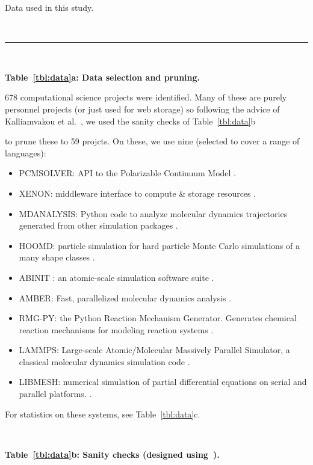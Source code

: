 \documentclass[10pt,conference]{IEEEtran}
\newcommand{\bi}{\begin{itemize}[leftmargin=0.4cm]}
\newcommand{\ei}{\end{itemize}}
\newcommand{\tbl}[1]{Table~\ref{tbl:#1}}
\begin{document}
    
\begin{table}
\caption{Data used in this study.}\label{tbl:data}
 
~\hrule~
 

\begin{minipage}{.45\linewidth}

{\bf \tbl{data}a: Data selection and pruning.}
\vspace{1mm}
{\small 
 
678 computational science projects were identified.
Many of these are purely personnel projects (or just used for web storage)
so following the advice of Kalliamvakou et al.~\cite{Kalliamvakou:2014}, we used the sanity
checks of \tbl{data}b} to prune these  to 59 projcts.
On these, we  use nine  (selected to cover a  range of languages):
\bi
\item PCMSOLVER:   API to the Polarizable Continuum Model \cite{pcmsolver}.
\item XENON: middleware      interface to  compute \& storage resources \cite{xenon}.

\item MDANALYSIS: Python code to analyze molecular dynamics trajectories generated  from other simulation packages \cite{mdanalysis}.
\item  HOOMD:  particle simulation  for  hard particle Monte Carlo simulations of a many shape classes  \cite{hoomd}.  
\item ABINIT  : an atomic-scale simulation software suite \cite{Abinit}.
\item  AMBER: Fast, parallelized molecular dynamics   analysis \cite{Amber-MD}.

\item  RMG-PY: the Python Reaction Mechanism Generator.  Generates chemical reaction mechanisms for modeling reaction systems \cite{ReactionMechanismGenerator}.
\item LAMMPS: Large-scale Atomic/Molecular Massively Parallel Simulator, a classical molecular dynamics simulation code \cite{lammps-sandia}.
\item LIBMESH:   numerical simulation of partial differential equations   on serial and parallel platforms.  \cite{libMesh}.
\ei
For statistics on these systems, see \tbl{data}c.

\end{minipage}~~~~\begin{minipage}{.55\linewidth}
 \begin{center}
{\bf \tbl{data}b: Sanity checks (designed using~\cite{Kalliamvakou:2014}).}



\end{center}
\end{minipage}
\end{table}
\end{document}
